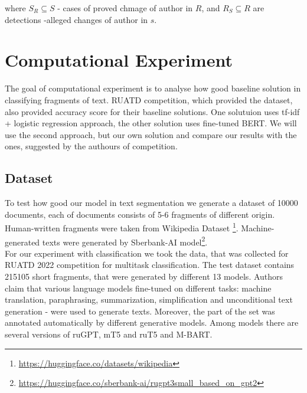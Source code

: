 \documentclass{article}
\begin{document}
where $S_{R} \subseteq S$ - cases of proved chmage of author in $R$, and $R_{S} \subseteq R$ are detections -alleged changes of author in $s$.

\section{Computational Experiment}

The goal of computational experiment is to analyse how good baseline solution in classifying fragments of text. RUATD  competition, which provided the dataset, also provided accuracy score for their baseline solutions. One solutuion uses tf-idf + logistic regression approach, the other solution uses fine-tuned BERT. We will use the second approach, but our own solution and compare our results with the ones, suggested by the authours of competition.


\subsection{Dataset}

To test how good our model in text segmentation we generate a dataset of 10000 documents, each of documents consists of 5-6 fragments of different origin. Human-written fragments were taken from Wikipedia Dataset \footnote{\url{https://huggingface.co/datasets/wikipedia}}. Machine-generated texts were generated by Sberbank-AI model\footnote{\url{https://huggingface.co/sberbank-ai/rugpt3small_based_on_gpt2}}. \\
For our experiment with classification we took the data, that was collected for RUATD 2022 competition\cite{ruatd-dataset} for multitask classification. The test dataset contains 215105 short fragments, that were generated by different 13 models. Authors claim that various language models fine-tuned on different tasks: machine translation, paraphrasing, summarization, simplification and unconditional text generation - were used to generate texts. Moreover, the part of the set was annotated automatically by different generative models. Among models there are several versions of ruGPT, mT5 and ruT5 and M-BART.
\end{document}
